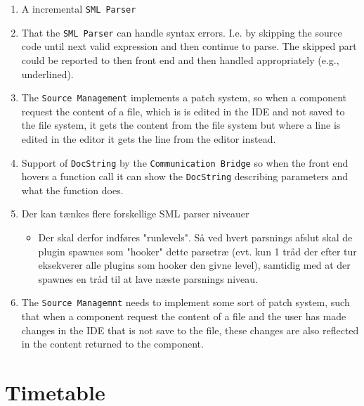 \documentclass[a4paper,oneside]{memoir}
\begin{document}
\begin{enumerate}
\item A incremental \texttt{SML Parser}

\item That the \texttt{SML Parser} can handle syntax errors. I.e. by
  skipping the source code until next valid expression and then
  continue to parse. The skipped part could be reported to then front
  end and then handled appropriately (e.g., underlined).

\item The \texttt{Source Management} implements a patch system, so when a
  component request the content of  a file, which is is edited in the IDE and
  not saved to the file system, it gets the content from the file system but
  where a line is edited in the editor it gets the line from the editor instead.

\item Support of \texttt{DocString} by the \texttt{Communication
    Bridge} so when the front end hovers a function call it can show
  the \texttt{DocString} describing parameters and what the function
  does.

\item Der kan tænkes flere forskellige SML parser niveauer
  \begin{itemize}
    
  \item Der skal derfor indføres "runlevels". Så ved hvert parsnings
    afslut skal de plugin spawnes som "hooker" dette parsetræ
    (evt. kun 1 tråd der efter tur eksekverer alle plugins som hooker
    den givne level), samtidig med at der spawnes en tråd til at lave
    næste parsnings niveau.
  \end{itemize}


\item The \texttt{Source Managemnt} needs to implement some sort of patch
  system, such that when a component request the content of a file and the user
  has made changes in the IDE that is not save to the file, these changes are
  also reflected in the content returned to the component.
  
\end{enumerate}


\appendix

\chapter{Timetable}

\end{document}
